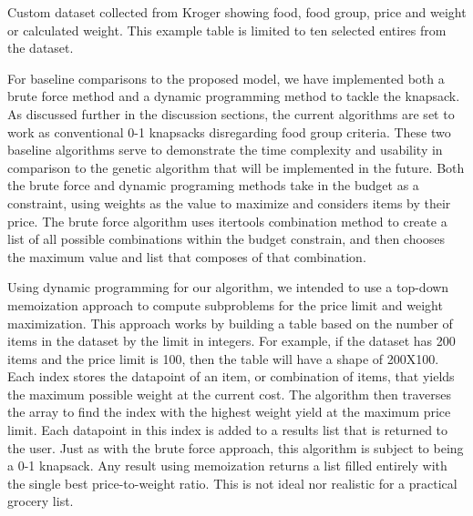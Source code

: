 \documentclass[10pt,journal,compsoc]{IEEEtran}
\begin{document}
\begin{table}[h]
    \setlength\tabcolsep{2pt}
    \centering
    
    \caption{Custom dataset collected from Kroger showing food, food group, price and weight or calculated weight. This example table is limited to ten selected entires from the dataset.}
    \label{table:Example of Groceries Dataset}
\end{table}

For baseline comparisons to the proposed model, we have implemented both a brute
force method and a dynamic programming method to tackle the knapsack. As
discussed further in the discussion sections, the current algorithms are set to
work as conventional 0-1 knapsacks disregarding food group criteria. These two
baseline algorithms serve to demonstrate the time complexity and usability in
comparison to the genetic algorithm that will be implemented in the future. Both
the brute force and dynamic programing methods take in the budget as a
constraint, using weights as the value to maximize and considers items by their
price. The brute force algorithm uses itertools combination method to create a
list of all possible combinations within the budget constrain, and then chooses
the maximum value and list that composes of that combination.

Using dynamic programming for our algorithm, we intended to use a top-down
memoization approach to compute subproblems for the price limit and weight
maximization. This approach works by building a table based on the number of
items in the dataset by the limit in integers. For example, if the dataset has
200 items and the price limit is 100, then the table will have a shape of
200X100. Each index stores the datapoint of an item, or combination of items,
that yields the maximum possible weight at the current cost. The algorithm then
traverses the array to find the index with the highest weight yield at the
maximum price limit. Each datapoint in this index is added to a results list
that is returned to the user. Just as with the brute force approach, this
algorithm is subject to being a 0-1 knapsack. Any result using memoization
returns a list filled entirely with the single best price-to-weight ratio. This
is not ideal nor realistic for a practical grocery list.
\end{document}
